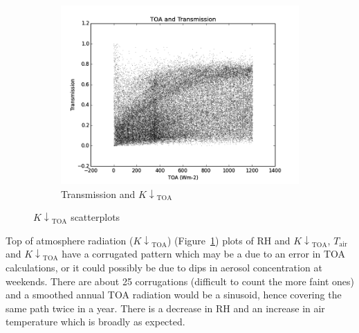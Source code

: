\documentclass[a4paper,titlepage, twoside]{report}
\newcommand\Kdowntoa{{K\!\!\downarrow}_\mathrm{TOA}}
\begin{document}
\begin{figure}
\begin{subfigure}{0.48\textwidth}
\includegraphics[width=\textwidth]{019_TOA_Tr.png}
\caption{Transmission and $\Kdowntoa$}
\end{subfigure}
\caption{$\Kdowntoa$ scatterplots}
\label{fig:data-4}
\end{figure}

Top of atmosphere radiation ($\Kdowntoa$) (Figure~\ref{fig:data-4}) plots of $\mathrm{RH}$ and $\Kdowntoa$, $T_\mathrm{air}$ and $\Kdowntoa$ have a corrugated pattern which may be a due to an error in TOA calculations, or it could possibly be due to dips in aerosol concentration at weekends. There are about 25 corrugations (difficult to count the more faint ones) and a smoothed annual TOA radiation would be a sinusoid, hence  covering the same path twice in a year. There is a decrease in RH and an increase in air temperature which is broadly as expected.
\end{document}
